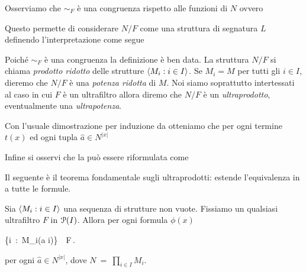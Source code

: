 Osserviamo che $\sim_F$ \`e una congruenza rispetto alle funzioni di $N$ ovvero


Questo permette di considerare $N/F$ come una struttura di segnatura $L$ definendo l'interpretazione come segue



Poich\'e $\sim_F$ \`e una congruenza la definizione  \`e ben data.
La struttura $N/F$ si chiama \emph{prodotto ridotto\/} delle strutture  $\<M_i:i\in I\>$. Se $M_i=M$ per tutti gli $i\in I$, dieremo che $N/F$ \`e una \emph{potenza ridotta\/} di $M$. Noi siamo soprattutto intertessati al caso in cui $F$ \`e un ultrafiltro allora diremo che $N/F$ \`e un \emph{ultraprodotto}, eventualmente una \emph{ultrapotenza}.


Con l'usuale dimostrazione per induzione da  otteniamo che per ogni termine $t(x)$ ed ogni tupla $\hat a\in N^{|x|}$



Infine si osservi che la  pu\`o essere riformulata come




Il seguente \`e il teorema fondamentale sugli ultraprodotti: estende l'equivalenza in  a tutte le formule.

\begin{theorem}[di \L o\v{s}]
Sia $\<M_i : i\in I\>$ una sequenza di strutture non vuote. Fissiamo un qualsiasi ultrafiltro $F$ in $\P(I)$. Allora per ogni formula $\phi(x)$

%
{\IFF}%
{\Big\{i\ :\ M_i\models \phi(\hat a i)\Big\}\ \in\ F\,.}

per ogni $\hat a\in N^{|x|}$, dove $N\ =\ \displaystyle\prod_{i\in I}M_i$.
\end{theorem}

